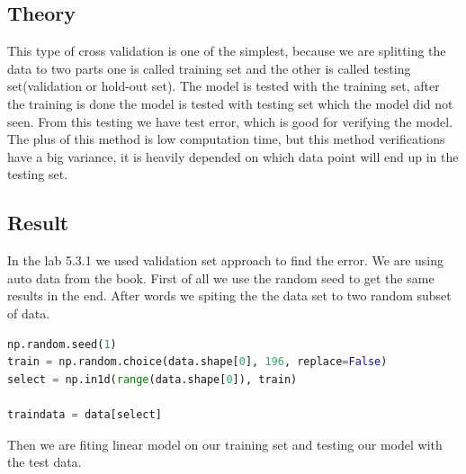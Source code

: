 \subsection{Theory}

This type of cross validation is one of the simplest, because we are splitting the data to two parts one is called training set and the other is called testing set(validation or hold-out set). The model is tested with the training set, after the training is done the model is tested with testing set which the model did not seen. From this testing we have test error, which is good for verifying the model. The plus of this method is low computation time, but this method verifications have a big variance, it is heavily depended on which data point will end up in the testing set.

\subsection{Result}

In the lab 5.3.1 we used validation set approach to find the error. We are using auto data from the book. First of all we use the random seed to get the same results in the end. After words we spiting the the data set to two random subset of data.

\begin{lstlisting}[language=Python]
np.random.seed(1)
train = np.random.choice(data.shape[0], 196, replace=False)
select = np.in1d(range(data.shape[0]), train)

traindata = data[select]
\end{lstlisting}

Then we are fiting linear model on our  training set and testing our model with the test data.

